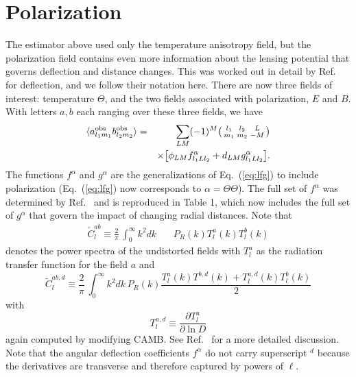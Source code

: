 \documentclass[prd,amsmath,amssymb,floatfix,superscriptaddress,nofootinbib,twocolumn]{revtex4-1}
\def\be{\begin{equation}}
\def\ee{\end{equation}}
\def\bea{\begin{eqnarray}}
\def\eea{\end{eqnarray}}
\newcommand{\vs}{\nonumber\\}
\newcommand{\ec}[1]{Eq.~(\ref{eq:#1})}
\newcommand{\wh}[1]{{\color{red} #1}}
\begin{document}
\section{Polarization}

The estimator above used only the temperature anisotropy field, but the polarization field contains even more information about the lensing potential that governs deflection and distance changes. This was worked out in detail by Ref.~\cite{Okamoto:2003zw} for deflection, and we follow their notation here. There are now three fields of interest: temperature $\Theta$, and the two fields associated with polarization, $E$ and $B$. With letters $a,b$ each ranging over these three fields, we have 
\bea
\langle a^{\rm obs}_{l_{1}m_{1}}b^{\rm obs}_{l_{2}m_{2}}\rangle &=& \sum_{LM}(-1)^{M}\bigl(\begin{smallmatrix} l_1 & l_2 & L \\ m_1 & m_2 & -M  \end{smallmatrix}\bigr)\nonumber \\
&&\times
\big[ \phi_{LM}f^{\alpha}_{l_{1}Ll_{2}} + d_{LM}g^{\alpha}_{l_{1}Ll_{2}} \big] 
.\eea
The functions $f^\alpha$ and $g^\alpha$ are the generalizations of \ec{lfg} to include polarization (\ec{lfg} now corresponds to $\alpha=\Theta\Theta$). The full set of $f^{\alpha}$ was determined by Ref.~\cite{Okamoto:2003zw} and is reproduced in Table 1, which now includes the full set of $g^{\alpha}$ that govern the impact of changing radial distances. Note
that
\bea
\tilde{C}^{ab}_{l} \equiv \frac{2}{\pi}\,\int_0^\infty k^{2}dk \,&&{P}_{R}(k) T^{a}_l(k) T^b_l(k) \eea
denotes the power spectra of the undistorted fields with $T_l^a$ as the radiation transfer
function for the field $a$ and \be
\tilde{C}^{ab,d}_{l} \equiv  \frac{2}{\pi}\,\int_0^\infty k^{2}dk \,{P}_{R}(k)\frac{T_l^{a}(k)T^{b,d}(k)+T_l^{a,d}(k)T_l^{b}(k)}{2} 
\ee
with 
\begin{equation}
T_l^{a,d} \equiv \frac{\partial T_l^a}{\partial \ln D}
\end{equation}
again computed by modifying CAMB.  
 See Ref.~\cite{Hu:1997de} for a more detailed discussion.
Note that the angular deflection coefficients $f^\alpha$ do not carry superscript $^d$ because the derivatives are transverse and therefore captured by powers of $\ell$. %
\end{document}
